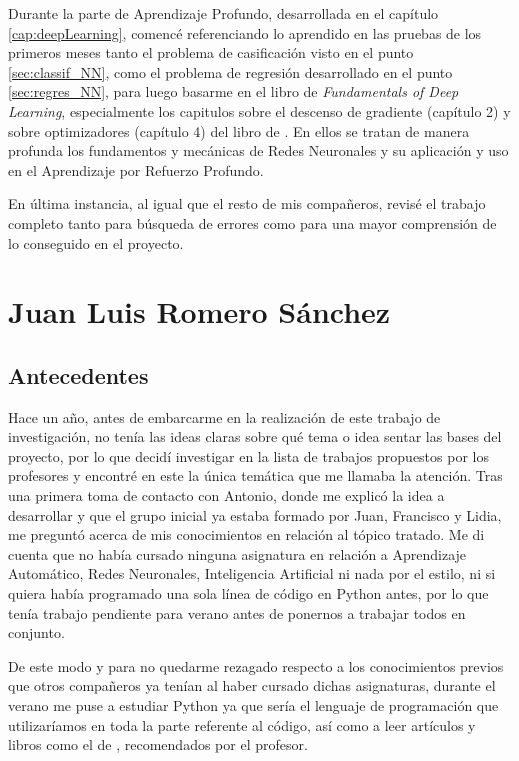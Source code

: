Durante la parte de Aprendizaje Profundo, desarrollada en el capítulo \ref{cap:deepLearning}, comencé referenciando lo aprendido en las pruebas de los primeros meses tanto el problema de casificación visto en el punto \ref{sec:classif_NN}, como el problema de regresión  desarrollado en el punto \ref{sec:regres_NN}, para luego basarme en el libro de \textit{Fundamentals of Deep Learning}, especialmente los capitulos sobre el descenso de gradiente (capítulo 2) y sobre  optimizadores (capítulo 4) del libro de \citet{Buduma:general}. En ellos se tratan de manera profunda los fundamentos y mecánicas de Redes Neuronales y su aplicación y uso en el Aprendizaje por Refuerzo Profundo.

En última instancia, al igual que el resto de mis compañeros, revisé el trabajo completo tanto para búsqueda de errores como para una mayor comprensión de lo conseguido en el proyecto.

\section{Juan Luis Romero Sánchez}

\subsection{Antecedentes}

Hace un año, antes de embarcarme en la realización de este trabajo de investigación, no tenía las ideas claras sobre qué tema o idea sentar las bases del proyecto, por lo que decidí investigar en la lista de trabajos propuestos por los profesores y encontré en este la única temática que me llamaba la atención. Tras una primera toma de contacto con Antonio, donde me explicó la idea a desarrollar y que el grupo inicial ya estaba formado por Juan, Francisco y Lidia, me preguntó acerca de mis conocimientos en relación al tópico tratado. Me di cuenta que no había cursado ninguna asignatura en relación a Aprendizaje Automático, Redes Neuronales, Inteligencia Artificial ni nada por el estilo, ni si quiera había programado una sola línea de código en Python antes, por lo que tenía trabajo pendiente para verano antes de ponernos a trabajar todos en conjunto.

De este modo y para no quedarme rezagado respecto a los conocimientos previos que otros compañeros ya tenían al haber cursado dichas asignaturas, durante el verano me puse a estudiar Python ya que sería el lenguaje de programación que utilizaríamos en toda la parte referente al código, así como a leer artículos \citep{mnih2013playing} \citep{Turing1950-TURCMA} \citep{Rodriguez2018} y libros como el de \citet{Buduma:general}, recomendados por el profesor. 

